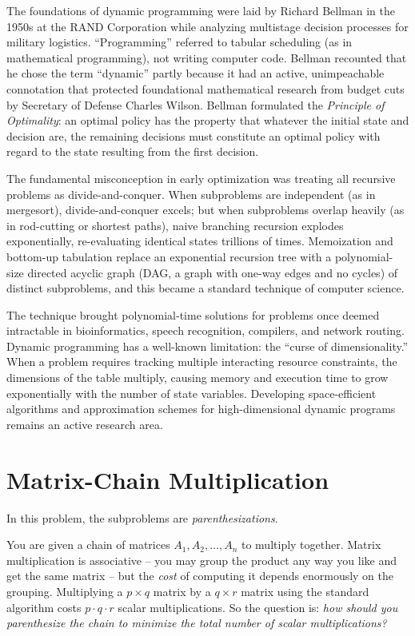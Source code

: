 \begin{historybox}
The foundations of dynamic programming were laid by Richard Bellman in the 1950s at the RAND Corporation while analyzing multistage decision processes for military logistics. ``Programming'' referred to tabular scheduling (as in mathematical programming), not writing computer code. Bellman recounted that he chose the term ``dynamic'' partly because it had an active, unimpeachable connotation that protected foundational mathematical research from budget cuts by Secretary of Defense Charles Wilson. Bellman formulated the \emph{Principle of Optimality}: an optimal policy has the property that whatever the initial state and decision are, the remaining decisions must constitute an optimal policy with regard to the state resulting from the first decision.

The fundamental misconception in early optimization was treating all recursive problems as divide-and-conquer. When subproblems are independent (as in mergesort), divide-and-conquer excels; but when subproblems overlap heavily (as in rod-cutting or shortest paths), naive branching recursion explodes exponentially, re-evaluating identical states trillions of times. Memoization and bottom-up tabulation replace an exponential recursion tree with a polynomial-size directed acyclic graph (DAG, a graph with one-way edges and no cycles) of distinct subproblems, and this became a standard technique of computer science.

The technique brought polynomial-time solutions for problems once deemed intractable in bioinformatics, speech recognition, compilers, and network routing. Dynamic programming has a well-known limitation: the ``curse of dimensionality.'' When a problem requires tracking multiple interacting resource constraints, the dimensions of the table multiply, causing memory and execution time to grow exponentially with the number of state variables. Developing space-efficient algorithms and approximation schemes for high-dimensional dynamic programs remains an active research area.
\end{historybox}

\section{Matrix-Chain Multiplication}
\label{ch15:matrixchain}

In this problem, the subproblems are \emph{parenthesizations}.

You are given a chain of matrices $A_1, A_2, \dots, A_n$ to multiply together.
Matrix multiplication is associative -- you may group the product any way you
like and get the same matrix -- but the \emph{cost} of computing it depends
enormously on the grouping. Multiplying a $p \times q$ matrix by a $q \times r$
matrix using the standard algorithm costs $p \cdot q \cdot r$ scalar
multiplications. So the question is: \emph{how should you parenthesize the
chain to minimize the total number of scalar multiplications?}

